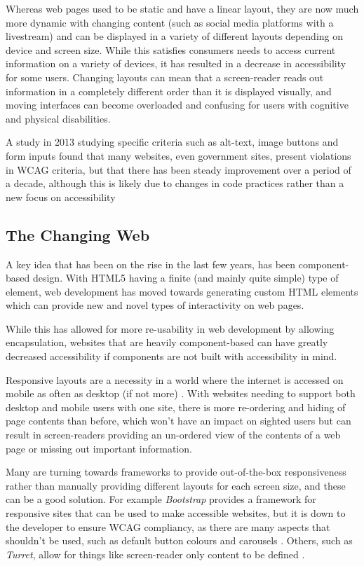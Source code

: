 \documentclass[ %
                    author={Aleena Baig},
                supervisor={Dr Simon Lock},
                    degree={BSc},
                     title={On Making Web Accessible Graphs},
                  subtitle={},
                      year={2019} ]{dissertation}
\begin{document}
Whereas web pages used to be static and have a linear layout, they are now much more dynamic with changing content (such as social media platforms with a livestream) and can be displayed in a variety of different layouts depending on device and screen size. While this satisfies consumers needs to access current information on a variety of devices, it has resulted in a decrease in accessibility for some users. Changing layouts can mean that a screen-reader reads out information in a completely different order than it is displayed visually, and moving interfaces can become overloaded and confusing for users with cognitive and physical disabilities.

A study in 2013 studying specific criteria such as alt-text, image buttons and form inputs found that many websites, even government sites, present violations in WCAG criteria, but that there has been steady improvement over a period of a decade, although this is likely due to changes in code practices rather than a new focus on accessibility \cite{progressaccessibility}

\subsection{The Changing Web}

A key idea that has been on the rise in the last few years, has been component-based design. With HTML5 having a finite (and mainly quite simple) type of element, web development has moved towards generating custom HTML elements which can provide new and novel types of interactivity on web pages.

While this has allowed for more re-usability in web development by allowing encapsulation, websites that are heavily component-based can have greatly decreased accessibility if components are not built with accessibility in mind.

Responsive layouts are a necessity in a world where the internet is accessed on mobile as often as desktop (if not more) \cite{mobileusestudy}. With websites needing to support both desktop and mobile users with one site, there is more re-ordering and hiding of page contents than before, which won't have an impact on sighted users but can result in screen-readers providing an un-ordered view of the contents of a web page or missing out important information.

Many are turning towards frameworks to provide out-of-the-box responsiveness rather than manually providing different layouts for each screen size, and these can be a good solution. For example \textit{Bootstrap} provides a framework for responsive sites that can be used to make accessible websites, but it is down to the developer to ensure WCAG compliancy, as there are many aspects that shouldn't be used, such as default button colours and carousels \cite{bootstrapaccessibility}. Others, such as \textit{Turret}, allow for things like screen-reader only content to be defined \cite{turretaccessibility}.
\end{document}
